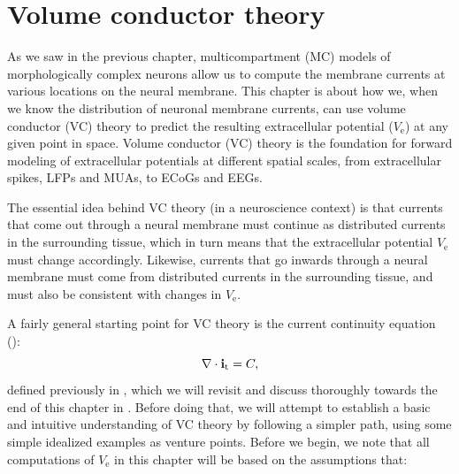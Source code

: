 \chapter{Volume conductor theory}
\label{chap:VC} %
As we saw in the previous chapter, multicompartment (MC) models of morphologically complex neurons 
allow us to compute the membrane currents at various locations on the neural membrane. 
This chapter is about how we, when we know the distribution of neuronal membrane currents, 
can use volume conductor (VC) theory to predict the resulting extracellular potential ($V_\mathrm{e}$) 
at any given point in space. Volume conductor (VC) theory is the foundation for forward modeling 
of extracellular potentials at different spatial scales, from extracellular spikes, 
LFPs and MUAs, to ECoGs and EEGs. 

The essential idea behind VC theory (in a neuroscience context) is that currents that come 
out through a neural membrane must continue as distributed currents in the surrounding tissue, 
which in turn means that the extracellular potential $V_\mathrm{e}$ 
must change accordingly. Likewise, currents that go inwards through a neural membrane must come 
from distributed currents in the surrounding tissue, and must also be consistent 
with changes in $V_\mathrm{e}$. 

A fairly general starting point for VC theory is the current continuity equation ():
\begin{equation}
{\bf \nabla} \cdot {\bf i}_\text{t} = C,
\label{eq:VC:CSD0}
\end{equation}
defined previously in , which we will revisit and discuss thoroughly towards the end of this 
chapter in . Before doing that, we will attempt to establish a basic and intuitive 
understanding of VC theory by following a simpler path, using some simple idealized examples as venture points. 
Before we begin, we note that all computations of $V_\mathrm{e}$ in this chapter
will be based on the assumptions that:

